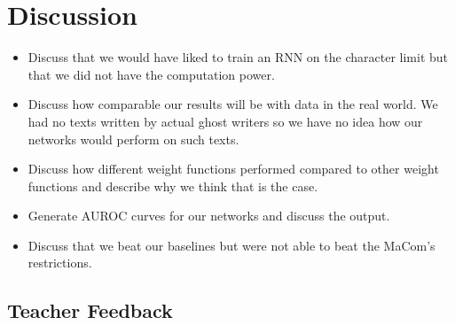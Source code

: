 \section{Discussion} \label{sec:discussion} 

\begin{itemize}

    \item

        Discuss that we would have liked to train an RNN on the character limit
        but that we did not have the computation power.

    \item

        Discuss how comparable our results will be with data in the real world.
        We had no texts written by actual ghost writers so we have no idea how
        our networks would perform on such texts.

    \item

        Discuss how different weight functions performed compared to other
        weight functions and describe why we think that is the case.

    \item

        Generate AUROC curves for our networks and discuss the output.

    \item

        Discuss that we beat our baselines but were not able to beat the MaCom's
        restrictions.

\end{itemize}


\subsection{Teacher Feedback}

